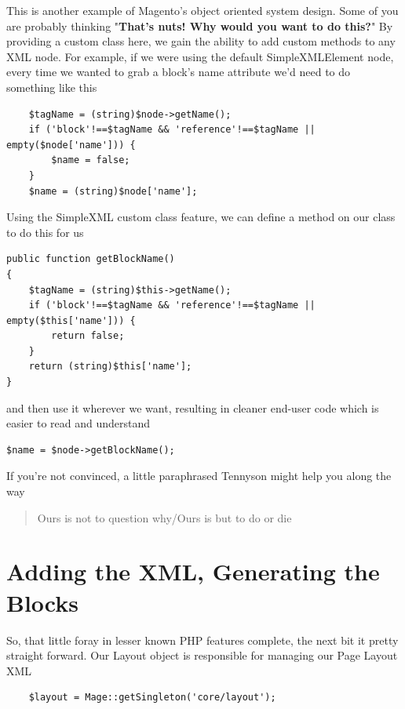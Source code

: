 \documentclass[oneside]{book}
\begin{document}
This is another example of Magento's object oriented system design. Some of you are probably thinking "\textbf{That's nuts! Why would you want to do this?}"  By providing a custom class here, we gain the ability to add custom methods to any XML node.  For example, if we were using the default SimpleXMLElement node, every time we wanted to grab a block's name attribute we'd need to do something like this

\begin{lstlisting}
    $tagName = (string)$node->getName();
    if ('block'!==$tagName && 'reference'!==$tagName || empty($node['name'])) {
        $name = false;
    }
    $name = (string)$node['name'];

\end{lstlisting}


Using the SimpleXML custom class feature, we can define a method on our class to do this for us

\begin{lstlisting}
public function getBlockName()
{
    $tagName = (string)$this->getName();
    if ('block'!==$tagName && 'reference'!==$tagName || empty($this['name'])) {
        return false;
    }
    return (string)$this['name'];
}

\end{lstlisting}


and then use it wherever we want, resulting in cleaner end-user code which is easier to read and understand

\begin{lstlisting}
$name = $node->getBlockName();

\end{lstlisting}


If you're not convinced, a little paraphrased Tennyson might help you along the way

\begin{quote}
Ours is not to question why/Ours is but to do or die
\end{quote}

\section{Adding the XML, Generating the Blocks}

So, that little foray in lesser known PHP features complete, the next bit it pretty straight forward.  Our Layout object is responsible for managing our  Page Layout XML

\begin{lstlisting}
    $layout = Mage::getSingleton('core/layout');    

\end{lstlisting}
\end{document}
